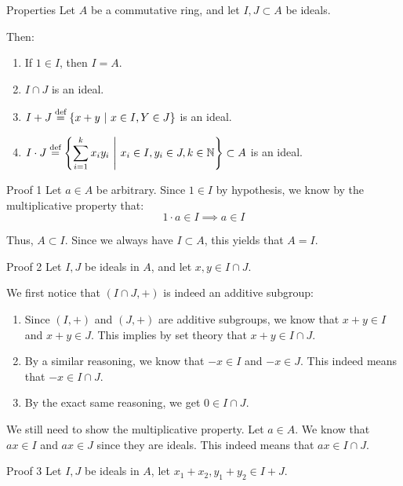 \documentclass[a4paper]{article}
\begin{document}
\begin{parag}{Properties}
    Let $A$ be a commutative ring, and let $I, J \subset A$ be ideals.

    Then:
    \begin{enumerate}
        \item If $1 \in I$, then $I = A$.
        \item $I \cap J$ is an ideal.
        \item $I + J \over{=}{def} \left\{x + y \suchthat x \in I, Y \in J\right\}$ is an ideal.
        \item $\displaystyle  I\cdot J \over{=}{def} \left\{\sum_{i=1}^{k} x_i y_i \suchthat x_i \in I, y_i \in J, k \in \mathbb{N}\right\} \subset A$ is an ideal.
    \end{enumerate}
    
    \begin{subparag}{Proof 1}
        Let $a \in A$ be arbitrary. Since $1 \in I$ by hypothesis, we know by the multiplicative property that: 
        \[1\cdot a \in I \implies a \in I\]
        
        Thus, $A \subset I$. Since we always have $I \subset A$, this yields that $A = I$.
    \end{subparag}

    \begin{subparag}{Proof 2}
        Let $I, J$ be ideals in $A$, and let $x, y \in I \cap J$.

        We first notice that $\left(I \cap J, +\right)$ is indeed an additive subgroup:
        \begin{enumerate}
            \item Since $\left(I, +\right)$ and $\left(J, +\right)$ are additive subgroups, we know that $x+y \in I$ and $x + y \in J$. This implies by set theory that $x + y \in  I \cap J$.
            \item By a similar reasoning, we know that $-x \in I$ and $-x \in J$. This indeed means that $-x \in I \cap J$.
            \item By the exact same reasoning, we get $0 \in I \cap J$. 
        \end{enumerate}
        
        We still need to show the multiplicative property. Let $a \in A$. We know that $ax \in I$ and $ax \in J$ since they are ideals. This indeed means that $ax \in I \cap J$.
    \end{subparag}

    \begin{subparag}{Proof 3}
        Let $I, J$ be ideals in $A$, let $x_1 + x_2, y_1 + y_2 \in I + J$. 


\end{subparag}
\end{parag}
\end{document}

